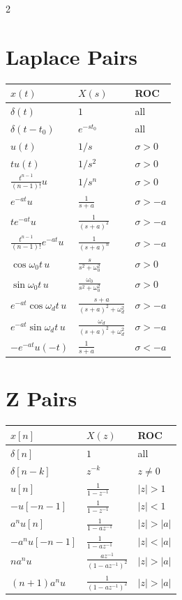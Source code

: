 \documentclass[11pt]{extarticle}
\begin{document}
\begin{paracol}{2}

\section*{Laplace Pairs}
\begin{tabular}{@{}l l l@{}}
\toprule
$x(t)$ & $X(s)$ & ROC \\
\midrule
$\delta(t)$ & $1$ & all \\
$\delta(t{-}t_0)$ & $e^{-st_0}$ & all \\
$u(t)$ & $1/s$ & $\sigma{>}0$ \\
$tu(t)$ & $1/s^2$ & $\sigma{>}0$ \\
$\tfrac{t^{n-1}}{(n-1)!}u$ & $1/s^n$ & $\sigma{>}0$ \\
$e^{-at}u$ & $\tfrac{1}{s{+}a}$ & $\sigma{>}{-}a$ \\
$te^{-at}u$ & $\tfrac{1}{(s{+}a)^2}$ & $\sigma{>}{-}a$ \\
$\tfrac{t^{n-1}}{(n-1)!}e^{-at}u$ & $\tfrac{1}{(s{+}a)^n}$ & $\sigma{>}{-}a$ \\
$\cos\omega_0 t\,u$ & $\tfrac{s}{s^2{+}\omega_0^2}$ & $\sigma{>}0$ \\
$\sin\omega_0 t\,u$ & $\tfrac{\omega_0}{s^2{+}\omega_0^2}$ & $\sigma{>}0$ \\
$e^{-at}\!\cos\omega_d t\,u$ & $\tfrac{s{+}a}{(s{+}a)^2{+}\omega_d^2}$ & $\sigma{>}{-}a$ \\
$e^{-at}\!\sin\omega_d t\,u$ & $\tfrac{\omega_d}{(s{+}a)^2{+}\omega_d^2}$ & $\sigma{>}{-}a$ \\
$-e^{-at}u(-t)$ & $\tfrac{1}{s{+}a}$ & $\sigma{<}{-}a$ \\
\bottomrule
\end{tabular}

\vspace{6pt}
\section*{Z Pairs}
\begin{tabular}{@{}l l l@{}}
\toprule
$x[n]$ & $X(z)$ & ROC \\
\midrule
$\delta[n]$ & $1$ & all \\
$\delta[n{-}k]$ & $z^{-k}$ & $z{\ne}0$ \\
$u[n]$ & $\tfrac{1}{1-z^{-1}}$ & $|z|{>}1$ \\
$-u[-n{-}1]$ & $\tfrac{1}{1-z^{-1}}$ & $|z|{<}1$ \\
$a^n u[n]$ & $\tfrac{1}{1-az^{-1}}$ & $|z|{>}|a|$ \\
$-a^n u[-n{-}1]$ & $\tfrac{1}{1-az^{-1}}$ & $|z|{<}|a|$ \\
$na^n u$ & $\tfrac{az^{-1}}{(1-az^{-1})^2}$ & $|z|{>}|a|$ \\
$(n{+}1)a^n u$ & $\tfrac{1}{(1-az^{-1})^2}$ & $|z|{>}|a|$ \\
\bottomrule
\end{tabular}


\end{paracol}
\end{document}
